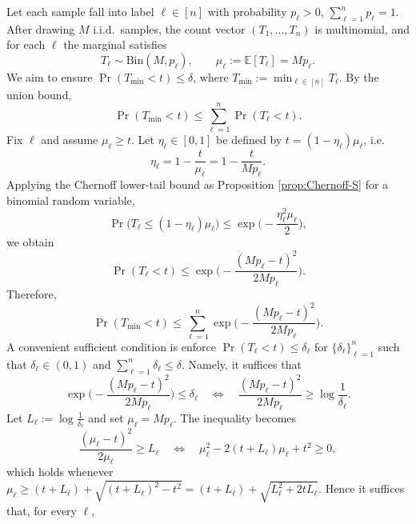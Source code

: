 \documentclass[aps,prx,reprint,superscriptaddress,amsmath,amssymb,longbibliography,floatfix]{revtex4-2}
\newcommand{\dsE}{\mathbb{E}}
\theoremstyle{plain}
\theoremstyle{definition}
\theoremstyle{remark}
\begin{document}
Let each sample fall into label $\ell\in[n]$ with probability $p_\ell>0$, $\sum_{\ell=1}^n p_\ell=1$. After drawing $M$ i.i.d.\ samples, the count vector $(T_1,\dots,T_n)$ is multinomial, and for each $\ell$ the marginal satisfies
\begin{equation*}
    T_\ell \sim \mathrm{Bin}(M,p_\ell),\qquad \mu_\ell:=\dsE[T_\ell]=Mp_\ell.
\end{equation*}
We aim to ensure $\Pr(T_{\min} < t)\le \delta$, where $T_{\min}:=\min_{\ell\in[n]}T_\ell$. By the union bound,
\begin{equation*}
    \Pr(T_{\min} < t)\le \sum_{\ell=1}^n \Pr(T_\ell < t).
\end{equation*}
Fix $\ell$ and assume $\mu_\ell \ge t$. Let $\eta_\ell\in[0,1]$ be defined by $t=(1-\eta_\ell)\mu_\ell$, i.e.
\begin{equation*}
    \eta_\ell = 1-\frac{t}{\mu_\ell}=1-\frac{t}{Mp_\ell}.
\end{equation*}
Applying the Chernoff lower-tail bound as Proposition \ref{prop:Chernoff-S} for a binomial random variable,
\begin{equation*}
    \Pr\!\big(T_\ell \le (1-\eta_\ell)\mu_\ell\big)\le \exp\!\Big(-\frac{\eta_\ell^2\mu_\ell}{2}\Big),
\end{equation*}
we obtain
\begin{equation}
    \Pr(T_\ell < t)\le \exp\!\Big(-\frac{(Mp_\ell-t)^2}{2Mp_\ell}\Big).
\end{equation}
Therefore,
\begin{equation}
    \Pr(T_{\min} < t)\le \sum_{\ell=1}^n \exp\!\Big(-\frac{(Mp_\ell-t)^2}{2Mp_\ell}\Big).
    \label{eq:nonunif_Tmin_union_chernoff}
\end{equation}
A convenient sufficient condition is enforce
$\Pr(T_\ell<t)\le \delta_\ell$ for $\{\delta_\ell\}_{\ell=1}^n$ such that $\delta_\ell\in(0,1)$ and $\sum_{\ell=1}^n \delta_\ell \le \delta$. Namely, it suffices that
\begin{equation*}
    \exp\!\Big(-\frac{(Mp_\ell-t)^2}{2Mp_\ell}\Big)\le \delta_\ell
    \quad\Longleftrightarrow\quad
    \frac{(Mp_\ell-t)^2}{2Mp_\ell}\ge \log\frac{1}{\delta_\ell}.
\end{equation*}
Let $L_\ell:=\log\frac{1}{\delta_\ell}$ and set $\mu_\ell=Mp_\ell$. The inequality becomes
\begin{equation*}
    \frac{(\mu_\ell-t)^2}{2\mu_\ell}\ge L_\ell
    \quad\Longleftrightarrow\quad
    \mu_\ell^2-2(t+L_\ell)\mu_\ell+t^2\ge 0,
\end{equation*}
which holds whenever $\mu_\ell\ge (t+L_\ell)+\sqrt{(t+L_\ell)^2-t^2}=(t+L_\ell)+\sqrt{L_\ell^2+2tL_\ell}$. Hence it suffices that, for every $\ell$,
\end{document}
